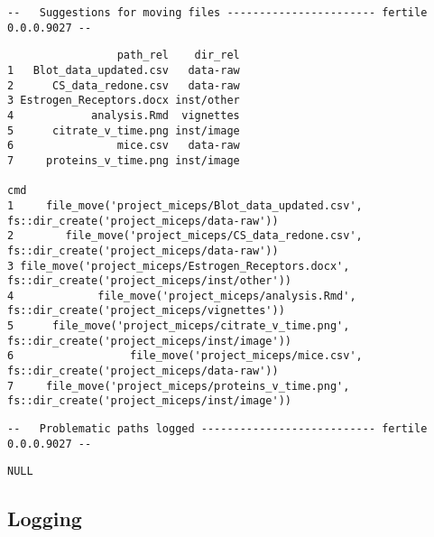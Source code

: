 \documentclass[12pt,twoside]{reedthesis}
\begin{document}
\begin{verbatim}
--   Suggestions for moving files ----------------------- fertile 0.0.0.9027 --
\end{verbatim}
\begin{verbatim}
                 path_rel    dir_rel
1   Blot_data_updated.csv   data-raw
2      CS_data_redone.csv   data-raw
3 Estrogen_Receptors.docx inst/other
4            analysis.Rmd  vignettes
5      citrate_v_time.png inst/image
6                mice.csv   data-raw
7     proteins_v_time.png inst/image
                                                                                               cmd
1     file_move('project_miceps/Blot_data_updated.csv', fs::dir_create('project_miceps/data-raw'))
2        file_move('project_miceps/CS_data_redone.csv', fs::dir_create('project_miceps/data-raw'))
3 file_move('project_miceps/Estrogen_Receptors.docx', fs::dir_create('project_miceps/inst/other'))
4             file_move('project_miceps/analysis.Rmd', fs::dir_create('project_miceps/vignettes'))
5      file_move('project_miceps/citrate_v_time.png', fs::dir_create('project_miceps/inst/image'))
6                  file_move('project_miceps/mice.csv', fs::dir_create('project_miceps/data-raw'))
7     file_move('project_miceps/proteins_v_time.png', fs::dir_create('project_miceps/inst/image'))
\end{verbatim}
\begin{verbatim}
--   Problematic paths logged --------------------------- fertile 0.0.0.9027 --
\end{verbatim}
\begin{verbatim}
NULL
\end{verbatim}
\subsection{Logging}\label{logging}
\end{document}
